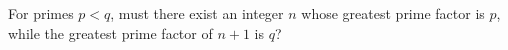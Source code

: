 For primes \(p<q\), must there exist an integer \(n\) whose greatest prime
factor is \(p\), while the greatest prime factor of \(n+1\) is \(q\)?
